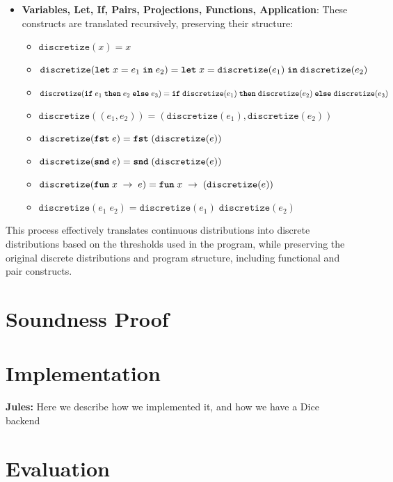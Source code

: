 \documentclass[acmsmall,screen,dvipsnames,x11names,nonacm,anonymous,review]{acmart}
\newcommand{\jules}[1]{{\color{blue}\textbf{Jules:} #1}}
\newcommand{\letkw}{\text{\ttfamily\bfseries let}}
\newcommand{\inkw}{\text{\ttfamily\bfseries in}}
\newcommand{\ifkw}{\text{\ttfamily\bfseries if}}
\newcommand{\thenkw}{\text{\ttfamily\bfseries then}}
\newcommand{\elsekw}{\text{\ttfamily\bfseries else}}
\newcommand{\fstkw}{\text{\ttfamily\bfseries fst}}
\newcommand{\sndkw}{\text{\ttfamily\bfseries snd}}
\newcommand{\funkw}{\text{\ttfamily\bfseries fun}}
\begin{document}
\begin{itemize}
    \item \textbf{Variables, Let, If, Pairs, Projections, Functions, Application}: These constructs are translated recursively, preserving their structure:
    \begin{itemize}
        \item $\texttt{discretize}(x) = x$
        \item $\texttt{discretize}(\letkw \; x = e_1 \; \inkw \; e_2) = \letkw \; x = \texttt{discretize}(e_1) \; \inkw \; \texttt{discretize}(e_2)$
        \item $\texttt{discretize}(\ifkw \; e_1 \; \thenkw \; e_2 \; \elsekw \; e_3) = \ifkw \; \texttt{discretize}(e_1) \; \thenkw \; \texttt{discretize}(e_2) \; \elsekw \; \texttt{discretize}(e_3)$
        \item $\texttt{discretize}((e_1, e_2)) = (\texttt{discretize}(e_1), \texttt{discretize}(e_2))$
        \item $\texttt{discretize}(\fstkw \; e) = \fstkw \; (\texttt{discretize}(e))$
        \item $\texttt{discretize}(\sndkw \; e) = \sndkw \; (\texttt{discretize}(e))$
        \item $\texttt{discretize}(\funkw \; x \; \rightarrow \; e) = \funkw \; x \; \rightarrow \; (\texttt{discretize}(e))$
        \item $\texttt{discretize}(e_1 \; e_2) = \texttt{discretize}(e_1) \; \texttt{discretize}(e_2)$
    \end{itemize}
\end{itemize}

This process effectively translates continuous distributions into discrete distributions based on the thresholds used in the program, while preserving the original discrete distributions and program structure, including functional and pair constructs.

\section{Soundness Proof}\label{sec:soundness}


\section{Implementation}\label{sec:implementation}

\jules{Here we describe how we implemented it, and how we have a Dice backend}


\section{Evaluation}\label{sec:evaluation}
\end{document}
